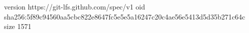 version https://git-lfs.github.com/spec/v1
oid sha256:5f89c94560aa5cbc822e8647fc5e5e5a16247c20c4ae56e5413d5d35b271c64c
size 1571
